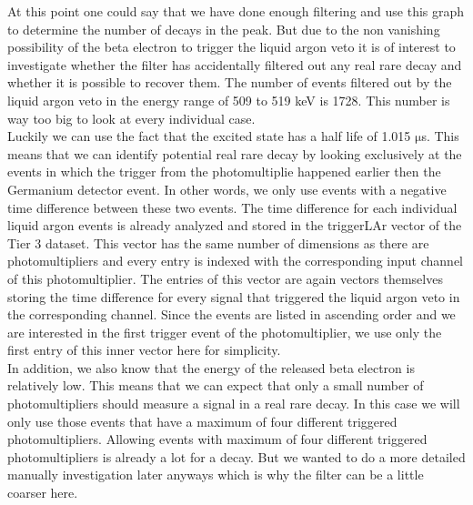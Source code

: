At this point one could say that we have done enough filtering and use this graph to determine the number of decays in the peak.
But due to the non vanishing possibility of the beta electron to trigger the liquid argon veto it is of interest to investigate whether the filter has accidentally filtered out any real rare  decay and whether it is possible to recover them.
The number of events filtered out by the liquid argon veto in the energy range of 509 to 519 keV is 1728.
This number is way too big to look at every individual case.
\\

Luckily we can use the fact that the excited  state has a half life of 1.015 \(\mathrm{\mu}\)s.
This means that we can identify potential real rare  decay by looking exclusively at the events in which the trigger from the photomultiplie happened earlier then the Germanium detector event.
In other words, we only use events with a negative time difference between these two events.
The time difference for each individual liquid argon events is already analyzed and stored in the triggerLAr vector of the Tier 3 dataset.
This vector has the same number of dimensions as there are photomultipliers and every entry is indexed with the corresponding input channel of this photomultiplier.
The entries of this vector are again vectors themselves storing the time difference for every signal that triggered the liquid argon veto in the corresponding channel.
Since the events are listed in ascending order and we are interested in the first trigger event of the photomultiplier, we use only the first entry of this inner vector here for simplicity.
\\

In addition, we also know that the energy of the released beta electron is relatively low.
This means that we can expect that only a small number of photomultipliers should measure a signal in a real rare  decay.
In this case we will only use those events that have a maximum of four different triggered photomultipliers.
Allowing events with maximum of four different triggered photomultipliers is already a lot for a  decay. 
But we wanted to do a more detailed manually investigation later anyways which is why the filter can be a little coarser here.
\\

